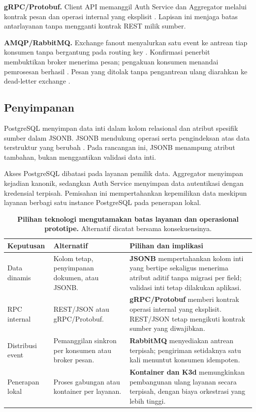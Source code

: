 \documentclass{fairmeta}
\begin{document}
\textbf{gRPC/Protobuf.} Client API memanggil Auth Service dan Aggregator melalui kontrak pesan dan operasi internal yang eksplisit \cite{grpc-core}. Lapisan ini menjaga batas antarlayanan tanpa mengganti kontrak REST milik sumber.


\textbf{AMQP/RabbitMQ.} Exchange fanout menyalurkan satu event ke antrean tiap konsumen tanpa bergantung pada routing key \cite{rabbit-exchanges}. Konfirmasi penerbit membuktikan broker menerima pesan; pengakuan konsumen menandai pemrosesan berhasil \cite{rabbit-confirms}. Pesan yang ditolak tanpa pengantrean ulang diarahkan ke dead-letter exchange \cite{rabbit-dlx}.

\subsection{Penyimpanan}

PostgreSQL menyimpan data inti dalam kolom relasional dan atribut spesifik sumber dalam JSONB. JSONB mendukung operasi serta pengindeksan atas data terstruktur yang berubah \cite{postgres-jsonb}. Pada rancangan ini, JSONB menampung atribut tambahan, bukan menggantikan validasi data inti.

Akses PostgreSQL dibatasi pada layanan pemilik data. Aggregator menyimpan kejadian kanonik, sedangkan Auth Service menyimpan data autentikasi dengan kredensial terpisah. Pemisahan ini mempertahankan kepemilikan data meskipun layanan berbagi satu instance PostgreSQL pada penerapan lokal.


\begin{table}[htbp]
\centering
\caption{\textbf{Pilihan teknologi mengutamakan batas layanan dan operasional prototipe.} Alternatif dicatat bersama konsekuensinya.}
\label{tab:tradeoffs}
\footnotesize
\begin{tabularx}{\textwidth}{@{}L{2.25cm}L{4.0cm}Y@{}}
\toprule
\textbf{Keputusan} & \textbf{Alternatif} & \textbf{Pilihan dan implikasi}\\
\midrule
Data dinamis & Kolom tetap, penyimpanan dokumen, atau JSONB. & \textbf{JSONB} mempertahankan kolom inti yang bertipe sekaligus menerima atribut aditif tanpa migrasi per field; validasi inti tetap dilakukan aplikasi.\\
\addlinespace[3pt]
RPC internal & REST/JSON atau gRPC/Protobuf. & \textbf{gRPC/Protobuf} memberi kontrak operasi internal yang eksplisit. REST/JSON tetap mengikuti kontrak sumber yang diwajibkan.\\
\addlinespace[3pt]
Distribusi event & Pemanggilan sinkron per konsumen atau broker pesan. & \textbf{RabbitMQ} menyediakan antrean terpisah; pengiriman setidaknya satu kali menuntut konsumen idempoten.\\
\addlinespace[3pt]
Penerapan lokal & Proses gabungan atau kontainer per layanan. & \textbf{Kontainer dan K3d} memungkinkan pembangunan ulang layanan secara terpisah, dengan biaya orkestrasi yang lebih tinggi.\\
\bottomrule
\end{tabularx}
\end{table}
\end{document}
